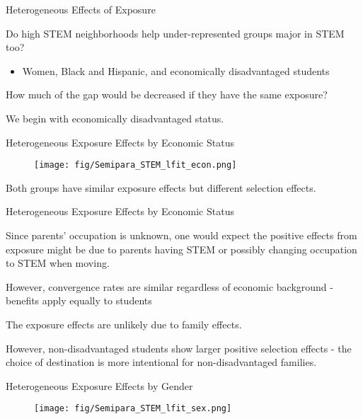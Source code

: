 \documentclass[aspectratio=169,xcolor=dvipsnames]{beamer}
\newenvironment{wideitemize}{\itemize\addtolength{\itemsep}{10pt}}{\enditemize}
\begin{document}
\begin{frame}{Heterogeneous Effects of Exposure}
\begin{wideitemize}
    \item Do high STEM neighborhoods help under-represented groups major in STEM too? 
    \begin{itemize}
        \item Women, Black and Hispanic, and economically disadvantaged students
    \end{itemize} 
    \item How much of the gap would be decreased if they have the same exposure?

    \item We begin with economically disadvantaged status. 
\end{wideitemize}
\end{frame}

\begin{frame}{Heterogeneous Exposure Effects by Economic Status}

\begin{figure}[H]
    \centering
    		\texttt{[image: fig/Semipara\_STEM\_lfit\_econ.png]}
    \end{figure}
Both groups have similar exposure effects but different selection effects.
\end{frame}

\begin{frame}{Heterogeneous Exposure Effects by Economic Status}
\begin{wideitemize}
    \item Since parents' occupation is unknown, one would expect the positive effects from exposure might be due to parents having STEM or possibly changing occupation to STEM when moving.
    \item  However, convergence rates are similar regardless of economic background - benefits apply equally to students
    \item The exposure effects are unlikely due to family effects.
    \item However, non-disadvantaged students show larger positive selection effects - the choice of destination is more intentional for non-disadvantaged families.

\end{wideitemize}
\end{frame}

\begin{frame}{Heterogeneous Exposure Effects by Gender}\label{hetero_sex}

\begin{figure}[H]
    \centering
    		\texttt{[image: fig/Semipara\_STEM\_lfit\_sex.png]}
    \end{figure}
\hyperlink{hetero_sex_engin}{}
\end{frame}
\end{document}
